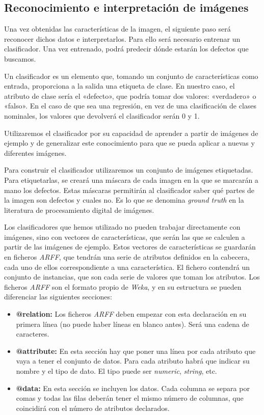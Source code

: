 \subsection{Reconocimiento e interpretación de imágenes}\label{reconocimiento}
Una vez obtenidas las características de la imagen, el siguiente paso será reconocer dichos datos e interpretarlos. Para ello será necesario entrenar un clasificador. Una vez entrenado, podrá predecir dónde estarán los defectos que buscamos.

Un clasificador \cite{wiki:Clasificadores} es un elemento que, tomando un conjunto de características como entrada, proporciona a la salida una etiqueta de clase. En nuestro caso, el atributo de clase sería el «defecto», que podría tomar dos valores: «verdadero» o «falso». En el caso de que sea una regresión, en vez de una clasificación de clases nominales, los valores que devolverá el clasificador serán 0 y 1.

Utilizaremos el clasificador por su capacidad de aprender a partir de imágenes de ejemplo y de generalizar este conocimiento para que se pueda aplicar a nuevas y diferentes imágenes.

Para construir el clasificador utilizaremos un conjunto de imágenes etiquetadas. Para etiquetarlas, se creará una máscara de cada imagen en la que se marcarán a mano los defectos. Estas máscaras permitirán al clasificador saber qué partes de la imagen son defectos y cuales no.  Es lo que se denomina \emph{ground truth} en la literatura de procesamiento digital de imágenes.

Los clasificadores que hemos utilizado no pueden trabajar directamente con imágenes, sino con vectores de características, que serán las que se calculen a partir de las imágenes de ejemplo. Estos vectores de características se guardarán en ficheros \textit{ARFF}, que tendrán una serie de atributos definidos en la cabecera, cada uno de ellos correspondiente a una característica. El fichero contendrá un conjunto de instancias, que son cada serie de valores que toman los atributos. Los ficheros \textit{ARFF} son el formato propio de \textit{Weka}, y en su estructura se pueden diferenciar las siguientes secciones:

\begin{itemize}
\item \textbf{@relation:} Los ficheros \textit{ARFF} deben empezar con esta declaración en su primera línea (no puede haber líneas en blanco antes). Será una cadena de caracteres.

\item \textbf{@attribute:} En esta sección hay que poner una línea por cada atributo que vaya a tener el conjunto de datos. Para cada atributo habrá que indicar su nombre y el tipo de dato. El tipo puede ser \emph{numeric}, \emph{string}, etc.

\item \textbf{@data:} En esta sección se incluyen los datos. Cada columna se separa por comas y todas las
filas deberán tener el mismo número de columnas, que coincidirá con el número de atributos declarados.
\end{itemize}

